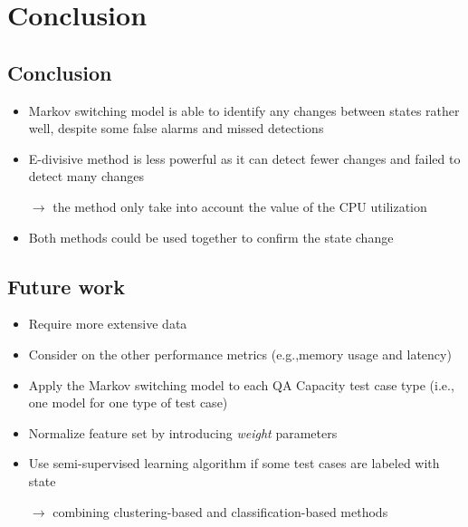 \documentclass{beamer}
\begin{document}

\section{Conclusion}
\subsection{Conclusion}
\begin{frame}
\begin{itemize}
	\item Markov switching model is able to identify any changes between states rather well, despite some false alarms and missed detections
	\item E-divisive method  is less powerful as it can detect fewer changes and failed to detect many changes
	
	$\rightarrow$ the method only take into account the value of the CPU utilization
	
	\item Both methods could be used together to confirm the state change
\end{itemize}
\end{frame}

\subsection{Future work}
\begin{frame}
\begin{itemize}
	\item Require more extensive data
	\item Consider on the other performance metrics (e.g.,memory usage and latency) 
	\item Apply the Markov switching model to each QA Capacity test case type (i.e., one model for one type of test case)
	\item Normalize feature set by introducing \textit{weight} parameters
	\item Use semi-supervised learning algorithm if some test cases are labeled with state
	
	$\rightarrow$ combining clustering-based and classification-based methods 
\end{itemize}
\end{frame}
\end{document}
